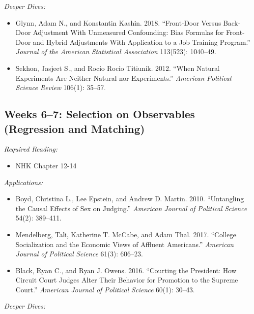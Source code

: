 \documentclass[11pt, letterpaper]{article}
\begin{document}
\noindent \textit{Deeper Dives:}

\begin{itemize}
	\item Glynn, Adam N., and Konstantin Kashin. 2018. ``Front-Door Versus Back-Door Adjustment With Unmeasured Confounding: Bias Formulas for Front-Door and Hybrid Adjustments With Application to a Job Training Program.'' \textit{Journal of the American Statistical Association} 113(523): 1040–49.
	\item Sekhon, Jasjeet S., and Rocío Rocio Titiunik. 2012. ``When Natural Experiments Are Neither Natural nor Experiments.'' \textit{American Political Science Review} 106(1): 35–57.
\end{itemize}

\subsection*{Weeks 6--7: Selection on Observables (Regression and Matching)}

\textit{Required Reading:}

\begin{itemize}
	\item NHK Chapter 12-14
\end{itemize}

\noindent \textit{Applications:}

\begin{itemize}
	\item Boyd, Christina L., Lee Epstein, and Andrew D. Martin. 2010. ``Untangling the Causal Effects of Sex on Judging.'' \textit{American Journal of Political Science} 54(2): 389–411.
	\item Mendelberg, Tali, Katherine T. McCabe, and Adam Thal. 2017. ``College Socialization and the Economic Views of Affluent Americans.'' \textit{American Journal of Political Science} 61(3): 606–23.
	\item Black, Ryan C., and Ryan J. Owens. 2016. “Courting the President: How Circuit Court Judges Alter Their Behavior for Promotion to the Supreme Court.” \textit{American Journal of Political Science} 60(1): 30–43.
\end{itemize}


\noindent \textit{Deeper Dives:}
\end{document}
